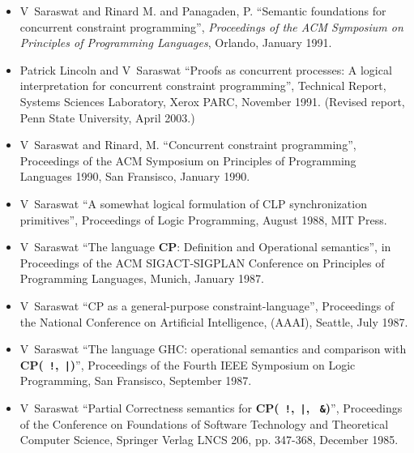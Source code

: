 \documentclass{article}
\begin{document}
\begin{itemize}
\item  V~Saraswat and Rinard M. and Panagaden, P. ``Semantic
  foundations for concurrent constraint programming'', \textit{
  Proceedings of the ACM Symposium on Principles of Programming
  Languages}, Orlando, January 1991.
  
\item Patrick Lincoln and V~Saraswat ``Proofs as concurrent
  processes: A logical interpretation for concurrent constraint
  programming'', Technical Report, Systems Sciences Laboratory, Xerox
  PARC, November 1991. (Revised report, Penn State University, April
  2003.)
  
\item  V~Saraswat and Rinard, M. ``Concurrent constraint
  programming'', Proceedings of the ACM Symposium on
  Principles of Programming Languages 1990, San Fransisco, January
  1990.
  
\item  V~Saraswat ``A somewhat logical formulation of CLP
  synchronization primitives'', Proceedings of Logic Programming,
  August 1988, MIT Press.
  
\item  V~Saraswat ``The language \textbf{CP}: Definition and
  Operational semantics'', in Proceedings of the ACM
  SIGACT-SIGPLAN Conference on Principles of Programming
  Languages, Munich, January 1987.
  
\item  V~Saraswat ``\textsf{CP} as a general-purpose
  constraint-language'', Proceedings of the National
  Conference on Artificial Intelligence, (AAAI), Seattle, July
  1987.
  
\item  V~Saraswat ``The language GHC: operational semantics
  and comparison with \textbf{CP(\texttt{ !},\texttt{ |})}'', Proceedings of the
  Fourth IEEE Symposium on Logic Programming, San Fransisco,
  September 1987.
  
\item  V~Saraswat ``Partial Correctness semantics for \textbf{
  CP(\texttt{ !},\texttt{ |}, \texttt{ \&})}'', Proceedings of the Conference on
  Foundations of Software Technology and Theoretical Computer
  Science, Springer Verlag LNCS 206, pp. 347-368, December 1985.
\end{itemize}
\end{document}
